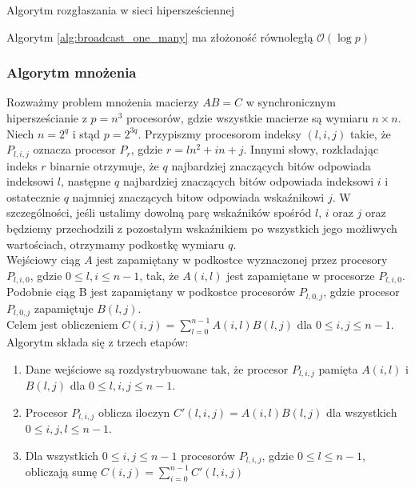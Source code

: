 \begin{algorithm}\label{alg:broadcast_one_many}
\caption{Algorytm rozgłaszania w sieci hipersześciennej}
\end{algorithm}


Algorytm \ref{alg:broadcast_one_many} ma złożoność równoległą \(\mathcal{O}(\log{p})\)

\subsubsection{Algorytm mnożenia}
Rozważmy problem mnożenia macierzy \(AB = C\) w synchronicznym hipersześcianie z \(p=n^3\) procesorów, gdzie wszystkie macierze są wymiaru \(n\times n\).\\
Niech \(n=2^q\) i stąd \(p=2^{3q}\). Przypiszmy procesorom indeksy \((l,i,j)\) takie, że \(P_{l,i,j}\) oznacza procesor \(P_r\), gdzie \(r=ln^{2}+in+j\). Innymi słowy, rozkładając indeks \(r\) binarnie otrzymuje, że \(q\) najbardziej znaczących bitów odpowiada indeksowi \(l\), następne \(q\) najbardziej znaczących bitów odpowiada indeksowi \(i\) i ostatecznie \(q\) najmniej znaczących bitow odpowiada wskaźnikowi \(j\). W szczególności, jeśli ustalimy dowolną parę wskaźników spośród \(l\), \(i\) oraz \(j\) oraz będziemy przechodzili z pozostałym wskaźnikiem po wszystkich jego możliwych wartościach, otrzymamy podkostkę wymiaru \(q\).\\

Wejściowy ciąg \(A\) jest zapamiętany w podkostce wyznaczonej przez procesory \(P_{l,i,0}\), gdzie \(0\leq l, i \leq n-1\), tak, że \(A(i,l)\) jest zapamiętane w procesorze \(P_{l,i,0}\).\\
Podobnie ciąg B jest zapamiętany w podkostce procesorów \(P_{l,0,j}\), gdzie procesor \(P_{l,0,j}\) zapamiętuje \(B(l,j)\).\\
Celem jest obliczeniem \(C(i,j)=\sum_{l=0}^{n-1}A(i,l)B(l,j)\) dla \(0\leq i, j\leq n-1\). Algorytm składa się z trzech etapów:
\begin{enumerate}
 \item Dane wejściowe są rozdystrybuowane tak, że procesor \(P_{l,i,j}\) pamięta \(A(i,l)\) i \(B(l,j)\) dla \(0\leq l, i, j \leq n-1\).
 \item Procesor \(P_{l,i,j}\) oblicza iloczyn \(C'(l,i,j)=A(i,l)B(l,j)\) dla wszystkich \(0\leq i, j, l \leq n-1\).
 \item Dla wszystkich \(0\leq i, j \leq n-1\) procesorów \(P_{l,i,j}\), gdzie \(0\leq l\leq n-1\), obliczają sumę \(C(i,j)=\sum_{i=0}^{n-1} C'(l,i,j)\)
\end{enumerate}

